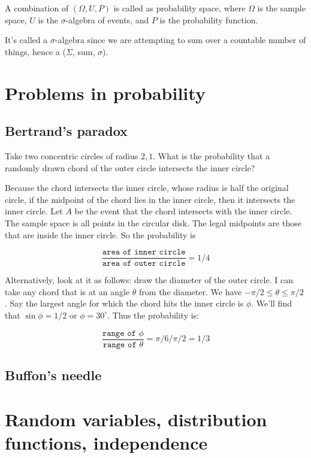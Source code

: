 \documentclass{book}
\theoremstyle{definition}
\begin{document}
A combination of $(\Omega, U, P)$ is called as probability space, where $\Omega$
is the sample space, $U$ is the $\sigma$-algebra of events, and $P$ is the
probability function.

It's called a $\sigma$-algebra since we are attempting to sum over a countable
number of things, hence a ($\Sigma$, sum, $\sigma$).

\chapter{Problems in probability}
\section{Bertrand's paradox}
Take two concentric circles of radius $2, 1$. What is the probability that
a randomly drawn chord of the outer circle intersects the inner circle?

Because the chord intersects the inner circle, whose radius is half the
original circle, if the midpoint of the chord lies in the inner circle, then it
intersects the inner circle. Let $A$ be the event that the chord intersects with
the inner circle. The sample space is all points in the circular disk. The
legal midpoints are those that are inside the inner circle. So the probability is

$$
\frac{\texttt{area of inner circle}}{\texttt{area of outer circle}} = 1/4
$$

Alternatively, look at it as follows:
draw the diameter of the outer circle. I can take any chord that is at an
angle $\theta$ from the diameter. We have $-\pi/2 \leq \theta \leq \pi/2$ . 
Say the largest angle for which the chord hits the inner circle is $\phi$. We'll
find that $\sin \phi = 1/2$ or $\phi = 30^\circ$. Thus the probability is:



$$
\frac{\texttt{range of $\phi$}}{\texttt{range of $\theta$}} = \pi/6/\pi/2 = 1/3
$$



\section{Buffon's needle}


\chapter{Random variables, distribution functions, independence}
\end{document}
